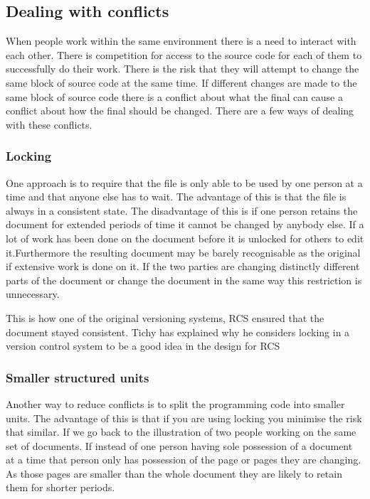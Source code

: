 
\subsection{Dealing with conflicts}
When people work within the same environment there is a need to interact with each other.
There is competition for access to the source code for each of them to successfully do their work.
There is the risk that they will attempt to change the same block of source code at the same time.
If different changes are made to the same block of source code there is a conflict about what the final can cause a conflict about how the final should be changed.
There are a few ways of dealing with these conflicts.

\subsubsection{Locking}
One approach is to require that the file is only able to be used by one person at a time and that anyone else has to wait. The advantage of this is that the file is always in a consistent state. The disadvantage of this is if one person retains the document for extended periods of time it cannot be changed by anybody else. If a lot of work has been done on the document before it is unlocked for others to edit it.Furthermore the resulting document may be barely recognisable as the original if extensive work is done on it. If the two parties are changing distinctly different parts of the document or change the document in the same way this restriction is unnecessary.

This is how one of the original versioning systems, RCS ensured that the document stayed consistent. Tichy has explained why he considers locking in a version control system to be a good idea in the design for RCS\cite{Tichy1982}

\subsubsection{Smaller structured units}
Another way to reduce conflicts is to split the programming code into smaller units.  The advantage of this is that if you are using locking you minimise the risk that similar. If we go back to the illustration of two people working on the same set of documents.  If instead of one person having sole possession of a document at a time that person only has possession of the page or pages they are changing. As those pages are smaller than the whole document they are likely to retain them for shorter periods.
